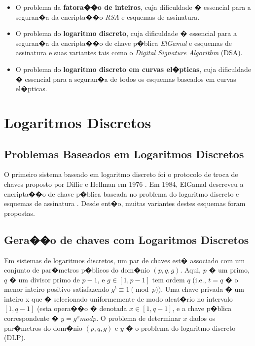 \documentclass[a4paper,capchap,espacoduplo,normaltoc]{abntepusp}
\begin{document}
\begin{itemize}
\item O problema da \textbf{fatora��o de inteiros}, cuja dificuldade � essencial para a seguran�a da encripta��o \emph{RSA} e esquemas de assinatura.
\item O problema do \textbf{logaritmo discreto}, cuja dificuldade � essencial para a seguran�a da encripta��o de chave p�blica \emph{ElGamal} e esquemas de assinatura e suas variantes tais como o \emph{Digital Signature Algorithm} (DSA).
\item O problema do \textbf{logaritmo discreto em curvas el�pticas}, cuja dificuldade � essencial para a seguran�a de todos os esquemas baseados em curvas el�pticas.\cite{menezes}
\end{itemize}

\section{Logaritmos Discretos}

\subsection{Problemas Baseados em Logaritmos Discretos}

O primeiro sistema baseado em logaritmo discreto foi o protocolo de troca de chaves proposto por Diffie e Hellman em 1976 \cite{diffie-hellman}. Em 1984, ElGamal descreveu a encripta��o de chave p�blica baseada no problema do logaritmo discreto e esquemas de assinatura \cite{elgamal}. Desde ent�o, muitas variantes destes esquemas foram propostas.


\subsection{Gera��o de chaves com Logaritmos Discretos}

Em sistemas de logaritmos discretos, um par de chaves est� associado com um conjunto de par�metros p�blicos do dom�nio $(p,q,g)$. Aqui, $p$ � um primo, $q$ � um divisor primo de $p-1$, e $g \in [1,p-1]$ tem ordem $q$ (i.e., $t=q$ � o menor inteiro positivo satisfazendo $g^{t} \equiv 1 \pmod p)$.
Uma chave privada � um inteiro x que � selecionado uniformemente de modo aleat�rio no intervalo $[1,q-1]$ (esta opera��o � denotada $x \in [1,q-1]$, e a chave p�blica correspondente � $y=g^{x}mod p$. O problema de determinar $x$ dados os par�metros do dom�nio $(p,q,g)$ e $y$ � o problema do logaritmo discreto (DLP).\cite{menezes}
\end{document}
